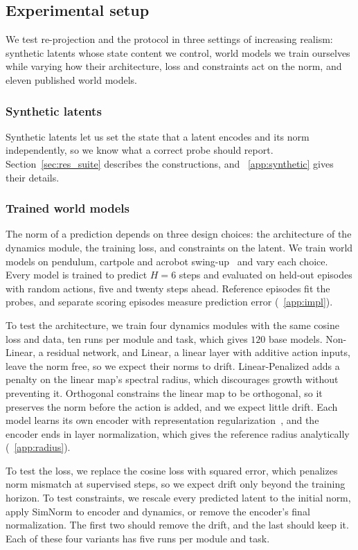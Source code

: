\subsection{Experimental setup}
\label{sec:variants}
\label{sec:suite}
We test re-projection and the protocol in three settings of increasing realism: synthetic latents whose state content we control, world models we train ourselves while varying how their architecture, loss and constraints act on the norm, and eleven published world models.

\subsubsection{Synthetic latents}
Synthetic latents let us set the state that a latent encodes and its norm independently, so we know what a correct probe should report. Section~\ref{sec:res_suite} describes the constructions, and \supsec~\ref{app:synthetic} gives their details.

\subsubsection{Trained world models}
\label{sec:protocol}
The norm of a prediction depends on three design choices: the architecture of the dynamics module, the training loss, and constraints on the latent. We train world models on pendulum, cartpole and acrobot swing-up~\citep{Tassa2018} and vary each choice. Every model is trained to predict $H=6$ steps and evaluated on held-out episodes with random actions, five and twenty steps ahead. Reference episodes fit the probes, and separate scoring episodes measure prediction error (\supsec~\ref{app:impl}).

To test the architecture, we train four dynamics modules with the same cosine loss and data, ten runs per module and task, which gives $120$ base models. Non-Linear, a residual network, and Linear, a linear layer with additive action inputs, leave the norm free, so we expect their norms to drift. Linear-Penalized adds a penalty on the linear map's spectral radius, which discourages growth without preventing it. Orthogonal constrains the linear map to be orthogonal, so it preserves the norm before the action is added, and we expect little drift. Each model learns its own encoder with representation regularization~\citep{Bardes2022}, and the encoder ends in layer normalization, which gives the reference radius analytically (\supsec~\ref{app:radius}).

To test the loss, we replace the cosine loss with squared error, which penalizes norm mismatch at supervised steps, so we expect drift only beyond the training horizon. To test constraints, we rescale every predicted latent to the initial norm, apply SimNorm to encoder and dynamics, or remove the encoder's final normalization. The first two should remove the drift, and the last should keep it. Each of these four variants has five runs per module and task.

